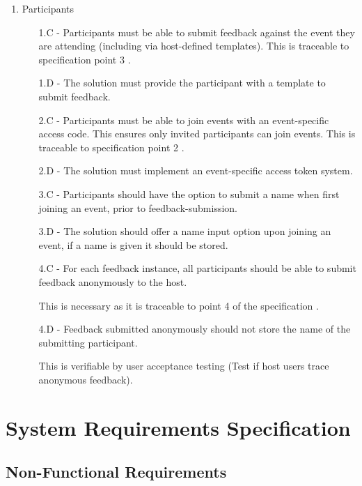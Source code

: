 \documentclass[9pt, titlepage]{extarticle}
\begin{document}
\begin{enumerate}[leftmargin=*]
 \item Participants
 \begin{enumerate}[noitemsep, topsep=0pt, leftmargin=9mm]
 \item[1.C -] Participants must be able to submit feedback against the event they are attending (including via host-defined templates). This is traceable to specification point 3 \autocite{web:spec}.
 \item[1.D -] The solution must provide the participant with a template to submit feedback.
 \vspace*{1mm}
 \item[2.C -] Participants must be able to join events with an event-specific access code. This ensures only invited participants can join events. This is traceable to specification point 2 \autocite{web:spec}.
 \item[2.D -] The solution must implement an event-specific access token system. %
 \vspace*{1mm}
 \item[3.C -] Participants should have the option to submit a name when first joining an event, prior to feedback-submission.
 \item[3.D -] The solution should offer a name input option upon joining an event, if a name is given it should be stored.
 \vspace*{1mm}
 \item[4.C -] For each feedback instance, all participants should be able to submit feedback anonymously to the host. 
 \item[] This is necessary as it is traceable to point 4 of the specification \autocite{web:spec}.
 \item[4.D -] Feedback submitted anonymously should not store the name of the submitting participant. 
 \item[] This is verifiable by user acceptance testing (Test if host users trace anonymous feedback).
\end{enumerate}

\end{enumerate}

\section{System Requirements Specification}

\subsection*{Non-Functional Requirements} \label{sec:req:nf}
\end{document}
